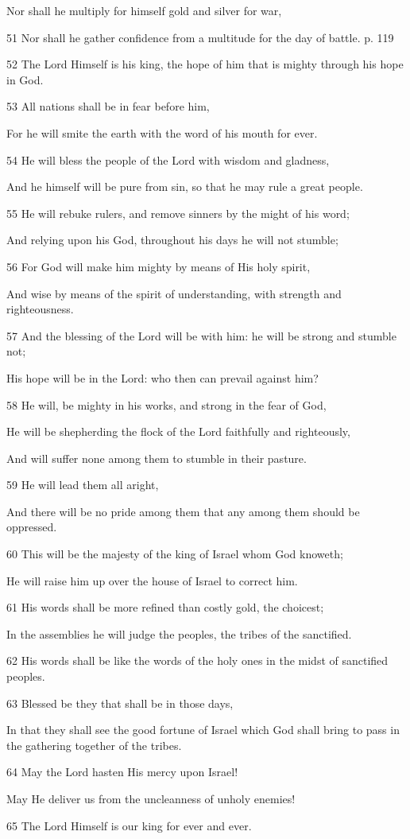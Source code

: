 \par  Nor shall he multiply for himself gold and silver for war,
\par    
\par 51 Nor shall he gather confidence from a multitude for the day of battle. p. 119
\par 52 The Lord Himself is his king, the hope of him that is mighty through his hope in God.
\par    
\par 53 All nations shall be in fear before him,
\par  For he will smite the earth with the word of his mouth for ever.
\par 54 He will bless the people of the Lord with wisdom and gladness,
\par  And he himself will be pure from sin, so that he may rule a great people.
\par 55 He will rebuke rulers, and remove sinners by the might of his word;
\par  And relying upon his God, throughout his days he will not stumble;
\par 56 For God will make him mighty by means of His holy spirit,
\par  And wise by means of the spirit of understanding, with strength and righteousness.
\par 57 And the blessing of the Lord will be with him: he will be strong and stumble not;
\par  His hope will be in the Lord: who then can prevail against him?
\par 58 He will, be mighty in his works, and strong in the fear of God,
\par  He will be shepherding the flock of the Lord faithfully and righteously,
\par  And will suffer none among them to stumble in their pasture.
\par 59 He will lead them all aright,
\par  And there will be no pride among them that any among them should be oppressed.
\par 60 This will be the majesty of the king of Israel whom God knoweth;
\par  He will raise him up over the house of Israel to correct him.
\par 61 His words shall be more refined than costly gold, the choicest;
\par  In the assemblies he will judge the peoples, the tribes of the sanctified.
\par 62 His words shall be like the words of the holy ones in the midst of sanctified peoples.
\par 63 Blessed be they that shall be in those days,
\par  In that they shall see the good fortune of Israel which God shall bring to pass in the gathering together of the tribes.
\par 64 May the Lord hasten His mercy upon Israel!
\par  May He deliver us from the uncleanness of unholy enemies!
\par 65 The Lord Himself is our king for ever and ever.

